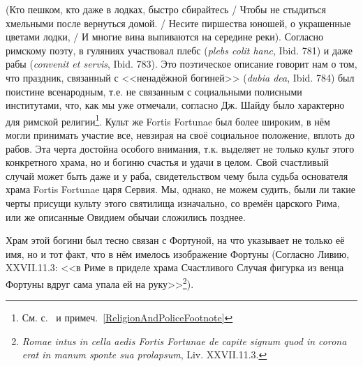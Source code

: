 (Кто пешком, кто даже в лодках, быстро сбирайтесь / Чтобы не стыдиться хмельными после вернуться домой. / Несите пиршества юношей, о украшенные цветами лодки, / И многие вина выпиваются на середине реки). Согласно римскому поэту, в гуляниях участвовал плебс (\textit{plebs colit hanc}, Ibid. 781) и даже рабы (\textit{convenit et servis}, Ibid. 783). Это поэтическое описание говорит нам о том, что праздник, связанный с <<ненадёжной богиней>> (\textit{dubia dea}, Ibid. 784) был поистине всенародным, т.е. не связанным с социальными полисными институтами, что, как мы уже отмечали, согласно Дж. Шайду было характерно для римской религии\footnote{См. с.~\pageref{ReligionAndPolice} и примеч.~\ref{ReligionAndPoliceFootnote}}. Культ же Fortis Fortunae был более широким, в нём могли принимать участие все, невзирая на своё социальное положение, вплоть до рабов. Эта черта достойна особого внимания, т.к. выделяет не только культ этого конкретного храма, но и богиню счастья и удачи в целом. Свой счастливый случай может быть даже и у раба, свидетельством чему была судьба основателя храма Fortis Fortunae царя Сервия. Мы, однако, не можем судить, были ли такие черты присущи культу этого святилища изначально, со времён царского Рима, или же описанные Овидием обычаи сложились позднее.

Храм этой богини был тесно связан с Фортуной, на что указывает не только её имя, но и тот факт, что в нём имелось изображение Фортуны (Согласно Ливию, XXVII.11.3: <<в Риме в приделе храма Счастливого Случая фигурка из венца Фортуны вдруг сама упала ей на руку>>\footnote{\textit{Romae intus in cella aedis Fortis Fortunae de capite signum quod in corona erat in manum sponte sua prolapsum}, Liv. XXVII.11.3.}). 


